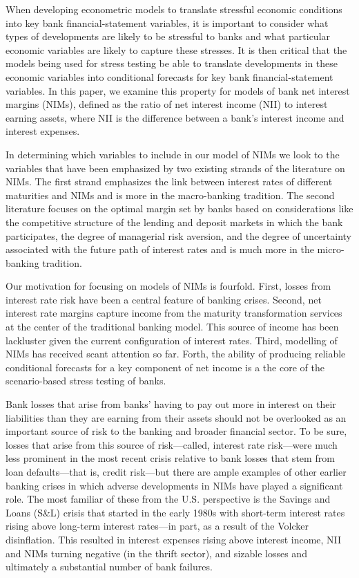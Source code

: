 \documentclass[11pt]{article}
\begin{document}
When developing econometric models to translate stressful economic conditions into key bank financial-statement variables, it is important to consider what types of developments are likely to be stressful to banks and what particular economic variables are likely to capture these stresses. It is then critical that the models being used for stress testing be able to translate developments in these economic variables into conditional forecasts for key bank financial-statement variables.  In this paper, we examine this property for models of bank net interest margins (NIMs), defined as the ratio of net interest income (NII) to interest earning assets, where NII is the difference between a bank's interest income and interest expenses.

In determining which variables to include in our model of NIMs we look to the variables that have been emphasized by two existing strands of the literature on NIMs.  The first strand emphasizes the link between interest rates of different maturities and NIMs and is more in the macro-banking tradition. The second literature focuses on the optimal margin set by banks based on considerations like the competitive structure of the lending and deposit markets in which the bank participates, the degree of managerial risk aversion, and the degree of uncertainty associated with the future path of interest rates and is much more in the micro-banking tradition.

Our motivation for focusing on models of NIMs is fourfold. First, losses from interest rate risk have been a central feature of banking crises. Second, net interest rate margins capture income from the maturity transformation services at the center of the traditional banking model. This source of income has been lackluster given the current configuration of interest rates. Third, modelling of NIMs has received scant attention so far. Forth, the ability of producing reliable conditional forecasts for a key component of net income is a the core of the scenario-based stress testing of banks.

Bank losses that arise from banks' having to pay out more in interest on their liabilities than they are earning from their assets should not be overlooked as an important source of risk to the banking and broader financial sector.  To be sure, losses that arise from this source of risk---called, interest rate risk---were much less prominent in the most recent crisis relative to bank losses that stem from loan defaults---that is, credit risk---but there are ample examples of other earlier banking crises in which adverse developments in NIMs have played a significant role.  The most familiar of these from the U.S. perspective is the Savings and Loans (S\&L) crisis that started in the early 1980s with short-term interest rates rising above long-term interest rates---in part, as a result of the Volcker disinflation.  This resulted in interest expenses rising above interest income, NII and NIMs turning negative (in the thrift sector), and sizable losses and ultimately a substantial number of bank failures.  
\end{document}
